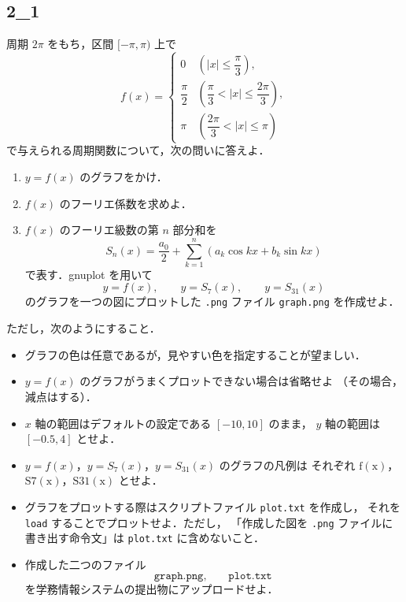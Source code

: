 \subsection{2_1}
\begin{exercise}
	周期 \(2\pi\) をもち，区間 \([-\pi,\pi)\) 上で
	\[
	f(x)=
	\begin{cases}
		0
		& \left(|x|\leq \dfrac{\pi}{3}\right),\\[6pt]
		\dfrac{\pi}{2}
		& \left(\dfrac{\pi}{3}<|x|\leq \dfrac{2\pi}{3}\right),\\[6pt]
		\pi
		& \left(\dfrac{2\pi}{3}<|x|\leq \pi\right)
	\end{cases}
	\]
	で与えられる周期関数について，次の問いに答えよ．
	
	\begin{enumerate}
		\item \(y=f(x)\) のグラフをかけ．
		\item \(f(x)\) のフーリエ係数を求めよ．
		\item \(f(x)\) のフーリエ級数の第 \(n\) 部分和を
		\[
		S_n(x)=\frac{a_0}{2}
		+\sum_{k=1}^{n}
		\left(
		a_k\cos kx+b_k\sin kx
		\right)
		\]
		で表す．gnuplot を用いて
		\[
		y=f(x),\qquad y=S_7(x),\qquad y=S_{31}(x)
		\]
		のグラフを一つの図にプロットした \texttt{.png} ファイル
		\texttt{graph.png} を作成せよ．
	\end{enumerate}
	
	ただし，次のようにすること．
	
	\begin{itemize}
		\item グラフの色は任意であるが，見やすい色を指定することが望ましい．
		\item \(y=f(x)\) のグラフがうまくプロットできない場合は省略せよ
		（その場合，減点はする）．
		\item \(x\) 軸の範囲はデフォルトの設定である \([-10,10]\) のまま，
		\(y\) 軸の範囲は \([-0.5,4]\) とせよ．
		\item \(y=f(x)\)，\(y=S_7(x)\)，\(y=S_{31}(x)\) のグラフの凡例は
		それぞれ \(\mathrm{f(x)}\)，\(\mathrm{S7(x)}\)，\(\mathrm{S31(x)}\) とせよ．
		\item グラフをプロットする際はスクリプトファイル \texttt{plot.txt} を作成し，
		それを \texttt{load} することでプロットせよ．ただし，
		「作成した図を \texttt{.png} ファイルに書き出す命令文」は
		\texttt{plot.txt} に含めないこと．
		\item 作成した二つのファイル
		\[
		\texttt{graph.png},\qquad \texttt{plot.txt}
		\]
		を学務情報システムの提出物にアップロードせよ．
	\end{itemize}
\end{exercise}
